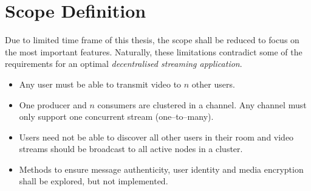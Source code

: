 \section{Scope Definition}

Due to limited time frame of this thesis, the scope shall be reduced to focus on the most important features. Naturally, these limitations contradict some of the requirements for an optimal \textit{decentralised streaming application}.

\begin{itemize}
    \item Any user must be able to transmit video to $n$ other users.
    \item One producer and $n$ consumers are clustered in a channel. Any channel must only support one concurrent stream (one–to–many).
    \item Users need not be able to discover all other users in their room and video streams should be broadcast to all active nodes in a cluster.
    \item Methods to ensure message authenticity, user identity and media encryption shall be explored, but not implemented.
\end{itemize}
